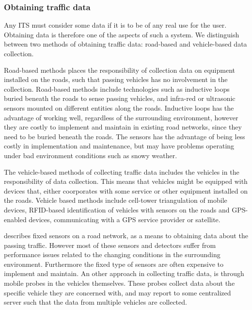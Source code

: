 \subsubsection*{Obtaining traffic data}
Any ITS must consider some data if it is to be of any real use for the user. Obtaining data is therefore one of the aspects of such a system. We distinguish between two methods of obtaining traffic data: road-based and vehicle-based data collection. 

Road-based methods places the responsibility of collection data on equipment installed on the roads, such that passing vehicles has no involvement in the collection. Road-based methods\cite{PIARC0} include technologies such as inductive loops buried beneath the roads to sense passing vehicles, and infra-red or ultrasonic sensors mounted on different entities along the roads. Inductive loops has the advantage of working well, regardless of the surrounding environment, however they are costly to implement and maintain in existing road networks, since they need to be buried beneath the roads. The sensors has the advantage of being less costly in implementation and maintenance, but may have problems operating under bad environment conditions such as snowy weather\cite{KamranHaas2007,PIARC0}.

The vehicle-based methods of collecting traffic data includes the vehicles in the responsibility of data collection. This means that vehicles might be equipped with devices that, either coorporates with some service or other equipment installed on the roads. Vehicle based methods include cell-tower triangulation of mobile devices, RFID-based identification of vehicles with sensors on the roads and GPS-enabled devices, communicating with a GPS service provider or satellite.

\cite{KamranHaas2007} describes fixed sensors on a road network, as a means to obtaining data about the passing traffic. However most of these sensors and detectors suffer from performance issues related to the changing conditions in the surrounding environment. Furthermore the fixed type of sensors are often expensive to implement and maintain\cite{KamranHaas2007}.
An other approach in collecting traffic data, is through mobile probes in the vehicles themselves. These probes collect data about the specific vehicle they are concerned with, and may report to some centralized server such that the data from multiple vehicles are collected. %

